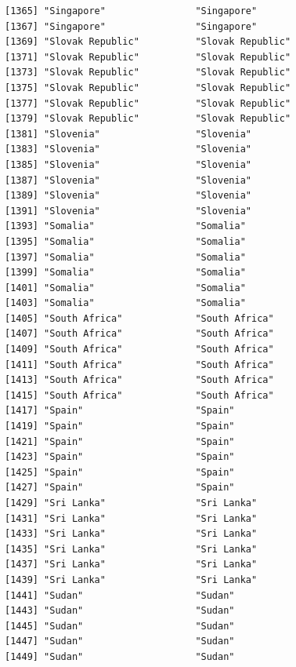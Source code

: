 \documentclass[
  letterpaper,
  DIV=11,
  numbers=noendperiod]{scrreprt}
\begin{document}
\begin{verbatim}
[1365] "Singapore"                "Singapore"               
[1367] "Singapore"                "Singapore"               
[1369] "Slovak Republic"          "Slovak Republic"         
[1371] "Slovak Republic"          "Slovak Republic"         
[1373] "Slovak Republic"          "Slovak Republic"         
[1375] "Slovak Republic"          "Slovak Republic"         
[1377] "Slovak Republic"          "Slovak Republic"         
[1379] "Slovak Republic"          "Slovak Republic"         
[1381] "Slovenia"                 "Slovenia"                
[1383] "Slovenia"                 "Slovenia"                
[1385] "Slovenia"                 "Slovenia"                
[1387] "Slovenia"                 "Slovenia"                
[1389] "Slovenia"                 "Slovenia"                
[1391] "Slovenia"                 "Slovenia"                
[1393] "Somalia"                  "Somalia"                 
[1395] "Somalia"                  "Somalia"                 
[1397] "Somalia"                  "Somalia"                 
[1399] "Somalia"                  "Somalia"                 
[1401] "Somalia"                  "Somalia"                 
[1403] "Somalia"                  "Somalia"                 
[1405] "South Africa"             "South Africa"            
[1407] "South Africa"             "South Africa"            
[1409] "South Africa"             "South Africa"            
[1411] "South Africa"             "South Africa"            
[1413] "South Africa"             "South Africa"            
[1415] "South Africa"             "South Africa"            
[1417] "Spain"                    "Spain"                   
[1419] "Spain"                    "Spain"                   
[1421] "Spain"                    "Spain"                   
[1423] "Spain"                    "Spain"                   
[1425] "Spain"                    "Spain"                   
[1427] "Spain"                    "Spain"                   
[1429] "Sri Lanka"                "Sri Lanka"               
[1431] "Sri Lanka"                "Sri Lanka"               
[1433] "Sri Lanka"                "Sri Lanka"               
[1435] "Sri Lanka"                "Sri Lanka"               
[1437] "Sri Lanka"                "Sri Lanka"               
[1439] "Sri Lanka"                "Sri Lanka"               
[1441] "Sudan"                    "Sudan"                   
[1443] "Sudan"                    "Sudan"                   
[1445] "Sudan"                    "Sudan"                   
[1447] "Sudan"                    "Sudan"                   
[1449] "Sudan"                    "Sudan"                   

\end{verbatim}
\end{document}
